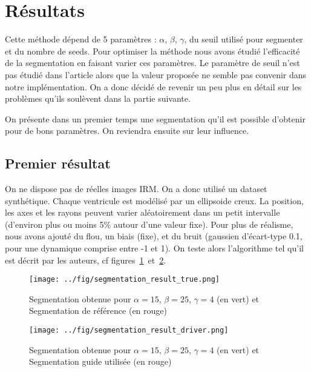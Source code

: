 \documentclass{article}
\begin{document}
\section{Résultats}

Cette méthode dépend de 5 paramètres : $\alpha$, $\beta$, $\gamma$, du seuil utilisé pour segmenter et du nombre de seeds. Pour optimiser la méthode nous avons étudié l’efficacité de la segmentation en faisant varier ces paramètres. Le paramètre de seuil n'est pas étudié dans l'article alors que la valeur proposée ne semble pas convenir dans notre implémentation. On a donc décidé de revenir un peu plus en détail sur les problèmes qu'ils soulèvent dans la partie suivante. 

On présente dans un premier temps une segmentation qu'il est possible d'obtenir pour de bons paramètres. On reviendra ensuite sur leur influence.

\subsection{Premier résultat}

On ne dispose pas de réelles images IRM. On a donc utilisé un dataset synthétique. Chaque ventricule est modélisé par un ellipsoide creux. La position, les axes et les rayons peuvent varier aléatoirement dans un petit intervalle (d'environ plus ou moins 5\% autour d'une valeur fixe). Pour plus de réalisme, nous avons ajouté du flou, un biais (fixe), et du bruit (gaussien d'écart-type 0.1, pour une dynamique comprise entre -1 et 1). On teste alors l'algorithme tel qu'il est décrit par les auteurs, cf figures~\ref{fig:seg1}~et~\ref{fig:seg2}.

\begin{figure}[h!]
  \begin{center}
    \caption{Segmentation obtenue pour $\alpha=15$, $\beta=25$, $\gamma=4$ (en vert) et Segmentation de référence (en rouge)}
    \texttt{[image: ../fig/segmentation\_result\_true.png]}
    \label{fig:seg1}
  \end{center}
\end{figure}
\begin{figure}[h!]
  \begin{center}
    \caption{Segmentation obtenue pour $\alpha=15$, $\beta=25$, $\gamma=4$ (en vert) et Segmentation guide utilisée (en rouge)}
    \texttt{[image: ../fig/segmentation\_result\_driver.png]}
    \label{fig:seg2}
  \end{center}
\end{figure}
\end{document}
